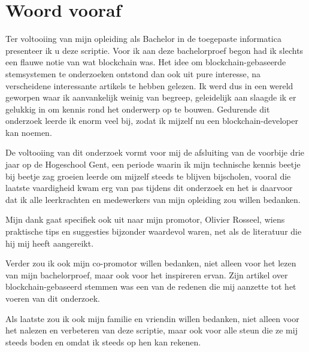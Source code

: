 
\chapter*{Woord vooraf}
\label{ch:voorwoord}


Ter voltooiing van mijn opleiding als Bachelor in de toegepaste informatica presenteer ik u deze scriptie.  Voor ik aan deze bachelorproef begon had ik slechts een flauwe notie van wat blockchain was. Het idee om blockchain-gebaseerde stemsystemen te onderzoeken ontstond dan ook uit pure interesse, na verscheidene interessante artikels te hebben gelezen. Ik werd dus in een wereld geworpen waar ik aanvankelijk weinig van begreep, geleidelijk aan slaagde ik er gelukkig in om kennis rond het onderwerp op te bouwen. Gedurende dit onderzoek leerde ik enorm veel bij, zodat ik mijzelf nu een blockchain-developer kan noemen.

De voltooiing van dit onderzoek vormt voor mij  de afsluiting van de voorbije drie jaar op de Hogeschool Gent, een periode waarin ik mijn technische kennis beetje bij beetje zag groeien leerde om mijzelf steeds te blijven bijscholen, vooral die laatste vaardigheid kwam erg van pas tijdens dit onderzoek en het is daarvoor dat ik alle leerkrachten en medewerkers van mijn opleiding zou willen bedanken.

Mijn dank gaat specifiek ook uit naar mijn promotor, Olivier Rosseel, wiens praktische tips en suggesties bijzonder waardevol waren, net als de literatuur die hij mij  heeft aangereikt.

Verder zou ik ook mijn co-promotor willen bedanken, niet alleen voor het lezen van mijn bachelorproef, maar ook voor het inspireren ervan. Zijn artikel over blockchain-gebaseerd stemmen was een van de redenen die mij aanzette tot het voeren van dit onderzoek.

Als laatste zou ik ook mijn familie en vriendin willen bedanken, niet alleen voor het nalezen en verbeteren van deze scriptie, maar ook voor alle steun die ze mij steeds boden en omdat ik steeds op hen kan rekenen.







